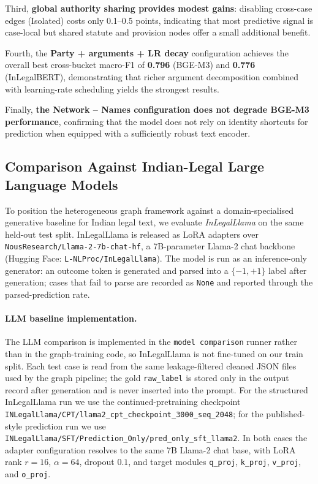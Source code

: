 \documentclass[runningheads]{llncs}
\begin{document}
Third, \textbf{global authority sharing provides modest gains}: disabling cross-case edges (Isolated) costs only 0.1--0.5 points, indicating that most predictive signal is case-local but shared statute and provision nodes offer a small additional benefit.

Fourth, the \textbf{Party + arguments + LR decay} configuration achieves the overall best cross-bucket macro-F1 of \textbf{0.796} (BGE-M3) and \textbf{0.776} (InLegalBERT), demonstrating that richer argument decomposition combined with learning-rate scheduling yields the strongest results.

Finally, \textbf{the Network -- Names configuration does not degrade BGE-M3 performance}, confirming that the model does not rely on identity shortcuts for prediction when equipped with a sufficiently robust text encoder.

\subsection{Comparison Against Indian-Legal Large Language Models}
\label{subsec:results-llm-comparison}

To position the heterogeneous graph framework against a domain-specialised generative baseline for Indian legal text, we evaluate \emph{InLegalLlama} on the same held-out test split. InLegalLlama is released as LoRA adapters over \texttt{NousResearch/Llama-2-7b-chat-hf}, a 7B-parameter Llama-2 chat backbone (Hugging Face: \texttt{L-NLProc/InLegalLlama}). The model is run as an inference-only generator: an outcome token is generated and parsed into a $\{-1, +1\}$ label after generation; cases that fail to parse are recorded as \texttt{None} and reported through the parsed-prediction rate.

\paragraph{LLM baseline implementation.}
The LLM comparison is implemented in the \texttt{model comparison} runner rather than in the graph-training code, so InLegalLlama is not fine-tuned on our train split. Each test case is read from the same leakage-filtered cleaned JSON files used by the graph pipeline; the gold \texttt{raw\_label} is stored only in the output record after generation and is never inserted into the prompt. For the structured InLegalLlama run we use the continued-pretraining checkpoint \texttt{INLegalLlama/CPT/llama2\_cpt\_checkpoint\_3000\_seq\_2048}; for the published-style prediction run we use \texttt{INLegalLlama/SFT/Prediction\_Only/pred\_only\_sft\_llama2}. In both cases the adapter configuration resolves to the same 7B Llama-2 chat base, with LoRA rank $r=16$, $\alpha=64$, dropout $0.1$, and target modules \texttt{q\_proj}, \texttt{k\_proj}, \texttt{v\_proj}, and \texttt{o\_proj}.
\end{document}
